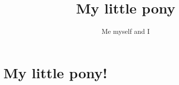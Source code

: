 \documentclass{report}
\title{My little pony}
\author{Me myself and I}
\begin{document}
\maketitle

\section{My little pony!} 
\end{document}
